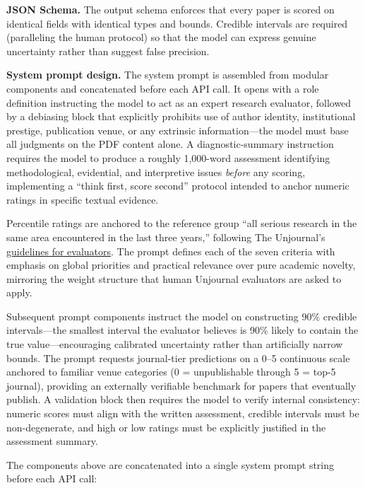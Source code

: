\documentclass[
  11pt,
  letterpaper,
]{article}
\begin{document}
\textbf{JSON Schema.} The output schema enforces that every paper is
scored on identical fields with identical types and bounds. Credible
intervals are required (paralleling the human protocol) so that the
model can express genuine uncertainty rather than suggest false
precision.

\textbf{System prompt design.} The system prompt is assembled from
modular components and concatenated before each API call. It opens with
a role definition instructing the model to act as an expert research
evaluator, followed by a debiasing block that explicitly prohibits use
of author identity, institutional prestige, publication venue, or any
extrinsic information---the model must base all judgments on the PDF
content alone. A diagnostic-summary instruction requires the model to
produce a roughly 1,000-word assessment identifying methodological,
evidential, and interpretive issues \emph{before} any scoring,
implementing a ``think first, score second'' protocol intended to anchor
numeric ratings in specific textual evidence.

Percentile ratings are anchored to the reference group ``all serious
research in the same area encountered in the last three years,''
following The Unjournal's
\href{https://globalimpact.gitbook.io/the-unjournal-project-and-communication-space/policies-projects-evaluation-workflow/evaluation/guidelines-for-evaluators}{guidelines
for evaluators}. The prompt defines each of the seven criteria with
emphasis on global priorities and practical relevance over pure academic
novelty, mirroring the weight structure that human Unjournal evaluators
are asked to apply.

Subsequent prompt components instruct the model on constructing 90\%
credible intervals---the smallest interval the evaluator believes is
90\% likely to contain the true value---encouraging calibrated
uncertainty rather than artificially narrow bounds. The prompt requests
journal-tier predictions on a 0--5 continuous scale anchored to familiar
venue categories (0 = unpublishable through 5 = top-5 journal),
providing an externally verifiable benchmark for papers that eventually
publish. A validation block then requires the model to verify internal
consistency: numeric scores must align with the written assessment,
credible intervals must be non-degenerate, and high or low ratings must
be explicitly justified in the assessment summary.

The components above are concatenated into a single system prompt string
before each API call:
\end{document}
